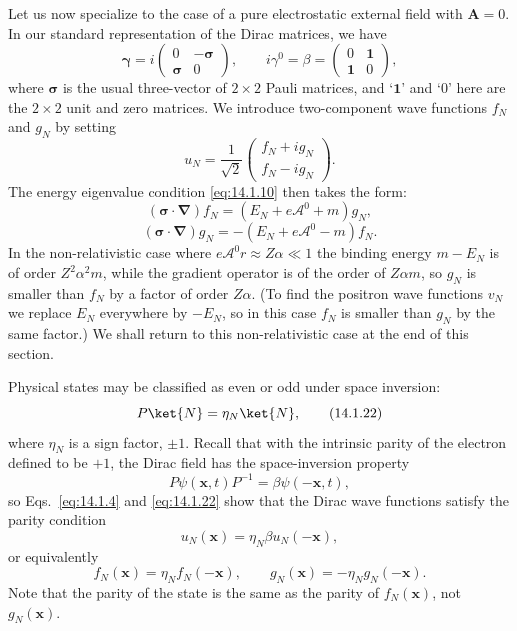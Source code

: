 Let us now specialize to the case of a pure electrostatic external field with
$\mathbf A=0$. In our standard representation of the Dirac matrices, we have
\[
  \boldsymbol\gamma=i\begin{pmatrix}0&-\boldsymbol\sigma\\
  \boldsymbol\sigma&0\end{pmatrix},\qquad
  i\gamma^0=\beta=\begin{pmatrix}0&\mathbf{1}\\\mathbf{1}&0\end{pmatrix},
\]
where $\boldsymbol\sigma$ is the usual three-vector of $2\times2$ Pauli
matrices, and `$\mathbf{1}$' and `$0$' here are the $2\times2$ unit and zero
matrices. We introduce two-component wave functions $f_N$ and $g_N$ by setting
\begin{equation}
  u_N=\frac1{\sqrt2}\begin{pmatrix}f_N+ig_N\\f_N-ig_N\end{pmatrix}.
  \tag{14.1.19}\label{eq:14.1.19}
\end{equation}
The energy eigenvalue condition \eqref{eq:14.1.10} then takes the form:
\begin{equation}
  (\boldsymbol\sigma\cdot\boldsymbol\nabla)f_N
  =(E_N+e\mathcal A^0+m)g_N,
  \tag{14.1.20}\label{eq:14.1.20}
\end{equation}
\begin{equation}
  (\boldsymbol\sigma\cdot\boldsymbol\nabla)g_N
  =-(E_N+e\mathcal A^0-m)f_N.
  \tag{14.1.21}\label{eq:14.1.21}
\end{equation}
In the non-relativistic case where $e\mathcal A^0r\approx Z\alpha\ll1$ the
binding energy $m-E_N$ is of order $Z^2\alpha^2m$, while the gradient operator
is of the order of $Z\alpha m$, so $g_N$ is smaller than $f_N$ by a factor of
order $Z\alpha$. (To find the positron wave functions $v_N$ we replace $E_N$
everywhere by $-E_N$, so in this case $f_N$ is smaller than $g_N$ by the same
factor.) We shall return to this non-relativistic case at the end of this
section.

Physical states may be classified as even or odd under space inversion:
\begin{equation}
  P\ket{N}=\eta_N\ket{N},
  \tag{14.1.22}\label{eq:14.1.22}
\end{equation}
where $\eta_N$ is a sign factor, $\pm1$. Recall that with the intrinsic parity
of the electron defined to be $+1$, the Dirac field has the space-inversion
property
\[
  P\psi(\mathbf x,t)P^{-1}=\beta\psi(-\mathbf x,t),
\]
so Eqs.~\eqref{eq:14.1.4} and \eqref{eq:14.1.22} show that the Dirac wave
functions satisfy the parity condition
\begin{equation}
  u_N(\mathbf x)=\eta_N\beta u_N(-\mathbf x),
  \tag{14.1.23}\label{eq:14.1.23}
\end{equation}
or equivalently
\begin{equation}
  f_N(\mathbf x)=\eta_Nf_N(-\mathbf x),\qquad
  g_N(\mathbf x)=-\eta_Ng_N(-\mathbf x).
  \tag{14.1.24}\label{eq:14.1.24}
\end{equation}
Note that the parity of the state is the same as the parity of $f_N(\mathbf x)$,
not $g_N(\mathbf x)$.


